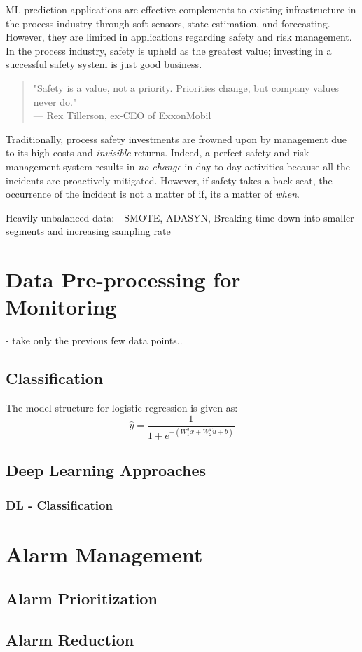 %
% 

ML prediction applications are effective complements to existing infrastructure in the process industry through soft sensors, state estimation, and forecasting. However, they are limited in applications regarding safety and risk management.  In the process industry, safety is upheld as the greatest value; investing in a successful safety system is just good business.  

\begin{quote}
    "Safety is a value, not a priority.  Priorities change, but company values never do." \\
    --- Rex Tillerson, ex-CEO of ExxonMobil
\end{quote}

Traditionally, process safety investments are frowned upon by management due to its high costs and \textit{invisible} returns. Indeed, a perfect safety and risk management system results in \textit{no change} in day-to-day activities because all the incidents are proactively mitigated.  However, if safety takes a back seat, the occurrence of the incident is not a matter of if, its a matter of \textit{when}. 






Heavily unbalanced data:
- SMOTE, ADASYN, Breaking time down into smaller segments and increasing sampling rate

\section{Data Pre-processing for Monitoring}
- take only the previous few data points..

\subsection{Classification}
The model structure for logistic regression is given as:
\begin{equation}
    \hat{y} = \frac{1}{1 + e^{-(W_1^Tx + W_2^Tu + b)}}
    \label{eq:02LogS}
\end{equation}

\subsection{Deep Learning Approaches}
\subsubsection{DL - Classification}

\section{Alarm Management}

\subsection{Alarm Prioritization}

\subsection{Alarm Reduction}
